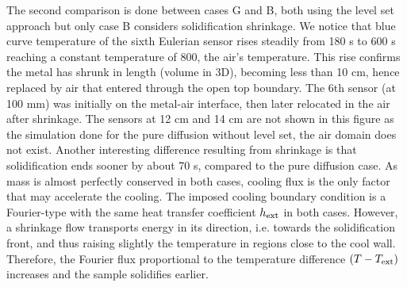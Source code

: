 The second comparison is done between cases G and B, both using the level set approach but only case B considers solidification shrinkage.
We notice that blue curve temperature of the sixth 
Eulerian sensor rises steadily from 180 s to 600 s reaching a constant temperature of \SI{800}{\udegC}, the air's temperature. 
This rise confirms the metal has shrunk in length (volume in 3D),
becoming less than 10 cm, hence replaced by air that entered through the open top boundary.
The 6$\text{th}$ sensor (at 100 mm) was initially on the metal-air interface, then later relocated in the air after shrinkage.
The sensors at 12 cm and 14 cm are not shown in this figure as the simulation done for the pure diffusion without level set, the air domain does not exist.
Another interesting difference resulting from shrinkage is that solidification ends sooner by about 70 s, compared to the pure diffusion case.
As mass is almost perfectly conserved in both cases, cooling flux is the only factor that may accelerate the cooling. The imposed cooling boundary condition
is a Fourier-type with the same heat transfer coefficient $h_{\text{ext}}$ in both cases. However, a shrinkage flow transports energy in its direction, i.e. towards the solidification
front, and thus raising slightly the temperature in regions close to the cool wall. Therefore, the Fourier flux proportional to the temperature difference $(T-T_{\text{ext}})$ increases
and the sample solidifies earlier. 

